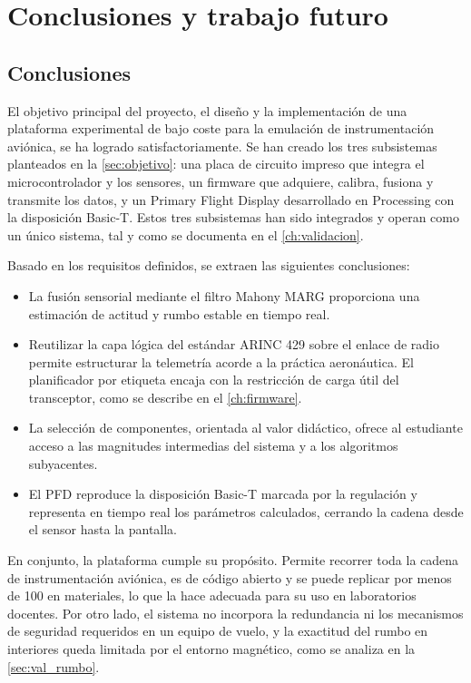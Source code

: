 
\chapter{Conclusiones y trabajo futuro}
\label{ch:conclusiones}

\section{Conclusiones}
\label{sec:conclusiones}

El objetivo principal del proyecto, el diseño y la implementación de una plataforma experimental de bajo coste para la emulación de instrumentación aviónica, se ha logrado satisfactoriamente. Se han creado los tres subsistemas planteados en la \cref{sec:objetivo}: una placa de circuito impreso que integra el microcontrolador y los sensores, un firmware que adquiere, calibra, fusiona y transmite los datos, y un Primary Flight Display desarrollado en Processing con la disposición Basic-T. Estos tres subsistemas han sido integrados y operan como un único sistema, tal y como se documenta en el \cref{ch:validacion}.

Basado en los requisitos definidos, se extraen las siguientes conclusiones:

\begin{itemize}
    \item La fusión sensorial mediante el filtro Mahony MARG proporciona una estimación de actitud y rumbo estable en tiempo real. 

    \item Reutilizar la capa lógica del estándar ARINC 429 sobre el enlace de radio permite estructurar la telemetría acorde a la práctica aeronáutica. El planificador por etiqueta encaja con la restricción de carga útil del transceptor, como se describe en el \cref{ch:firmware}.

    \item La selección de componentes, orientada al valor didáctico, ofrece al estudiante acceso a las magnitudes intermedias del sistema y a los algoritmos subyacentes.

    \item El PFD reproduce la disposición Basic-T marcada por la regulación y representa en tiempo real los parámetros calculados, cerrando la cadena desde el sensor hasta la pantalla.
\end{itemize}

En conjunto, la plataforma cumple su propósito. Permite recorrer toda la cadena de instrumentación aviónica, es de código abierto y se puede replicar por menos de \SI{100}{\eur} en materiales, lo que la hace adecuada para su uso en laboratorios docentes. Por otro lado, el sistema no incorpora la redundancia ni los mecanismos de seguridad requeridos en un equipo de vuelo, y la exactitud del rumbo en interiores queda limitada por el entorno magnético, como se analiza en la \cref{sec:val_rumbo}.


